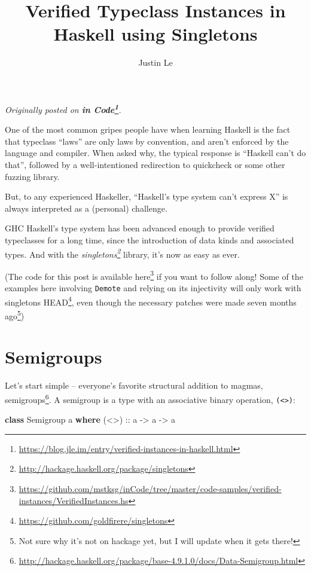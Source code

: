 \documentclass[]{article}
\title{Verified Typeclass Instances in Haskell using Singletons}
\author{Justin Le}
\newenvironment{Shaded}{}{}
\newcommand{\KeywordTok}[1]{\textcolor[rgb]{0.00,0.44,0.13}{\textbf{{#1}}}}
\newcommand{\DataTypeTok}[1]{\textcolor[rgb]{0.56,0.13,0.00}{{#1}}}
\newcommand{\OtherTok}[1]{\textcolor[rgb]{0.00,0.44,0.13}{{#1}}}
\newcommand{\NormalTok}[1]{{#1}}
\renewcommand{\href}[2]{#2\footnote{\url{#1}}}
\begin{document}
\maketitle

\emph{Originally posted on
\textbf{\href{https://blog.jle.im/entry/verified-instances-in-haskell.html}{in
Code}}.}

One of the most common gripes people have when learning Haskell is the fact that
typeclass ``laws'' are only laws by convention, and aren't enforced by the
language and compiler. When asked why, the typical response is ``Haskell can't
do that'', followed by a well-intentioned redirection to quickcheck or some
other fuzzing library.

But, to any experienced Haskeller, ``Haskell's type system can't express X'' is
always interpreted as a (personal) challenge.

GHC Haskell's type system has been advanced enough to provide verified
typeclasses for a long time, since the introduction of data kinds and associated
types. And with the
\emph{\href{http://hackage.haskell.org/package/singletons}{singletons}} library,
it's now as easy as ever.

(The code for this post is available
\href{https://github.com/mstksg/inCode/tree/master/code-samples/verified-instances/VerifiedInstances.hs}{here}
if you want to follow along! Some of the examples here involving \texttt{Demote}
and relying on its injectivity will only work with
\href{https://github.com/goldfirere/singletons}{singletons HEAD}, even though
the necessary patches were made seven months ago\footnote{Not sure why it's not
  on hackage yet, but I will update when it gets there!})

\section{Semigroups}\label{semigroups}

Let's start simple -- everyone's favorite structural addition to magmas,
\href{http://hackage.haskell.org/package/base-4.9.1.0/docs/Data-Semigroup.html}{semigroups}.
A semigroup is a type with an associative binary operation,
\texttt{(\textless{}\textgreater{})}:

\begin{Shaded}
\begin{Highlighting}[]
\KeywordTok{class} \DataTypeTok{Semigroup} \NormalTok{a }\KeywordTok{where}
\OtherTok{    (<>) ::} \NormalTok{a }\OtherTok{->} \NormalTok{a }\OtherTok{->} \NormalTok{a}
\end{Highlighting}
\end{Shaded}
\end{document}
